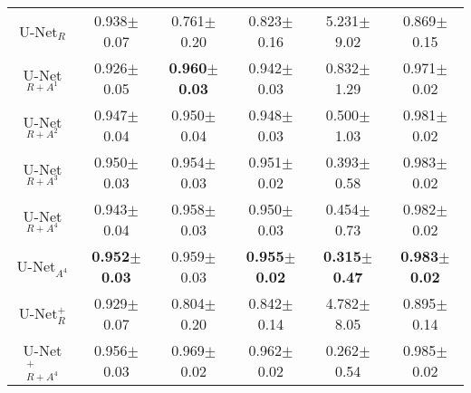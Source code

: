 \documentclass{midl} \usepackage{multirow}
\begin{document}
\begin{table}[t!]
{\begin{tabular}{|c|c|c|c|c|c|}
U-Net$_{R}$         & 0.938$\pm$0.07  & 0.761$\pm$0.20  & 0.823$\pm$0.16  & 5.231$\pm$9.02  & 0.869$\pm$0.15  \\
U-Net$_{R+A^1}$      & 0.926$\pm$0.05  & \bfseries 0.960$\pm$0.03  & 0.942$\pm$0.03  & 0.832$\pm$1.29  & 0.971$\pm$0.02  \\
U-Net$_{R+A^2}$      & 0.947$\pm$0.04  & 0.950$\pm$0.04  & 0.948$\pm$0.03  & 0.500$\pm$1.03  & 0.981$\pm$0.02  \\
U-Net$_{R+A^3}$      & 0.950$\pm$0.03  & 0.954$\pm$0.03  & 0.951$\pm$0.02  & 0.393$\pm$0.58  & 0.983$\pm$0.02  \\
U-Net$_{R+A^4}$      & 0.943$\pm$0.04  & 0.958$\pm$0.03  & 0.950$\pm$0.03  & 0.454$\pm$0.73  & 0.982$\pm$0.02  \\
U-Net$_{A^4}$        & \bfseries0.952$\pm$0.03  & 0.959$\pm$0.03  & \bfseries 0.955$\pm$0.02  & \bfseries 0.315$\pm$0.47  & \bfseries 0.983$\pm$0.02  \\ \hline
U-Net$_{R}^+$      & 0.929$\pm$0.07    &    0.804$\pm$0.20     &   0.842$\pm$0.14   &      4.782$\pm$8.05    &    0.895$\pm$0.14   \\
U-Net$_{R+A^4}^+$      & 0.956$\pm$0.03   &     0.969$\pm$0.02   &     0.962$\pm$0.02    &     0.262$\pm$0.54   &     0.985$\pm$0.02     \\ \hline
  \end{tabular}}
\end{table}
\end{document}

